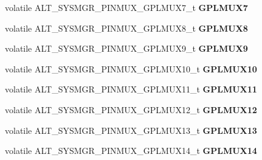 \begin{DoxyCompactItemize}
volatile A\+L\+T\+\_\+\+S\+Y\+S\+M\+G\+R\+\_\+\+P\+I\+N\+M\+U\+X\+\_\+\+G\+P\+L\+M\+U\+X7\+\_\+t {\bfseries G\+P\+L\+M\+U\+X7}
\item 
\mbox{\label{structALT__SYSMGR__PINMUX__s_a34b0cff39dad880c04dfa6ae7e25cc75}} 
volatile A\+L\+T\+\_\+\+S\+Y\+S\+M\+G\+R\+\_\+\+P\+I\+N\+M\+U\+X\+\_\+\+G\+P\+L\+M\+U\+X8\+\_\+t {\bfseries G\+P\+L\+M\+U\+X8}
\item 
\mbox{\label{structALT__SYSMGR__PINMUX__s_a715cc4e0ea9a455bd36171c22754de82}} 
volatile A\+L\+T\+\_\+\+S\+Y\+S\+M\+G\+R\+\_\+\+P\+I\+N\+M\+U\+X\+\_\+\+G\+P\+L\+M\+U\+X9\+\_\+t {\bfseries G\+P\+L\+M\+U\+X9}
\item 
\mbox{\label{structALT__SYSMGR__PINMUX__s_ab0ebc37771bac4cd5bae05a03deca0d6}} 
volatile A\+L\+T\+\_\+\+S\+Y\+S\+M\+G\+R\+\_\+\+P\+I\+N\+M\+U\+X\+\_\+\+G\+P\+L\+M\+U\+X10\+\_\+t {\bfseries G\+P\+L\+M\+U\+X10}
\item 
\mbox{\label{structALT__SYSMGR__PINMUX__s_a3beb87ac475f982aeafe313a53a20162}} 
volatile A\+L\+T\+\_\+\+S\+Y\+S\+M\+G\+R\+\_\+\+P\+I\+N\+M\+U\+X\+\_\+\+G\+P\+L\+M\+U\+X11\+\_\+t {\bfseries G\+P\+L\+M\+U\+X11}
\item 
\mbox{\label{structALT__SYSMGR__PINMUX__s_a5c1a4b99da4f76f2cad658c5cd4f73be}} 
volatile A\+L\+T\+\_\+\+S\+Y\+S\+M\+G\+R\+\_\+\+P\+I\+N\+M\+U\+X\+\_\+\+G\+P\+L\+M\+U\+X12\+\_\+t {\bfseries G\+P\+L\+M\+U\+X12}
\item 
\mbox{\label{structALT__SYSMGR__PINMUX__s_a31d5e11355834efc66766324df2d51b5}} 
volatile A\+L\+T\+\_\+\+S\+Y\+S\+M\+G\+R\+\_\+\+P\+I\+N\+M\+U\+X\+\_\+\+G\+P\+L\+M\+U\+X13\+\_\+t {\bfseries G\+P\+L\+M\+U\+X13}
\item 
\mbox{\label{structALT__SYSMGR__PINMUX__s_a0aad5a5f8cc4501304ee63400d0b76ea}} 
volatile A\+L\+T\+\_\+\+S\+Y\+S\+M\+G\+R\+\_\+\+P\+I\+N\+M\+U\+X\+\_\+\+G\+P\+L\+M\+U\+X14\+\_\+t {\bfseries G\+P\+L\+M\+U\+X14}
\item 
\mbox{\label{structALT__SYSMGR__PINMUX__s_a28717e633c425cee799e17aac789a3dd}} 

\end{DoxyCompactItemize}
